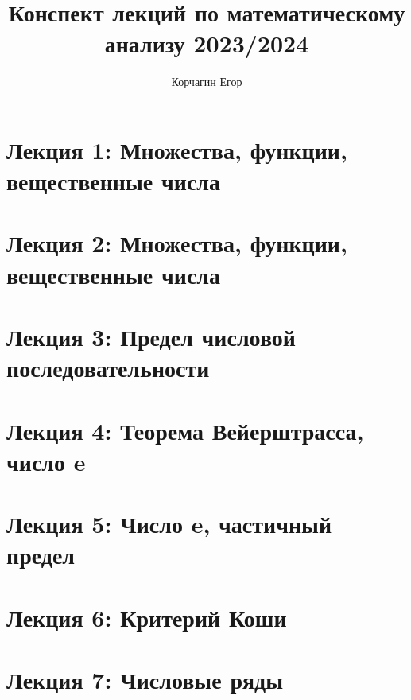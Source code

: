



	
	
	\title{Конспект лекций по математическому анализу 2023/2024}
	\author{Корчагин Егор}
	
	\maketitle{}
	
	\newpage
	
	\tableofcontents
	
	\newpage
	
	\large
	
	\section{Лекция 1: Множества, функции, вещественные числа}
	
	\newpage
	
	\section{Лекция 2: Множества, функции, вещественные числа}
	
	\newpage
	
	\section{Лекция 3: Предел числовой последовательности}
	
	\newpage
	
	\section{Лекция 4: Теорема Вейерштрасса, число e}
	
	\newpage
	
	\section{Лекция 5: Число e, частичный предел}
	
	\newpage
	
	\section{Лекция 6: Критерий Коши}
	
	\newpage
	
	\section{Лекция 7: Числовые ряды}
	
